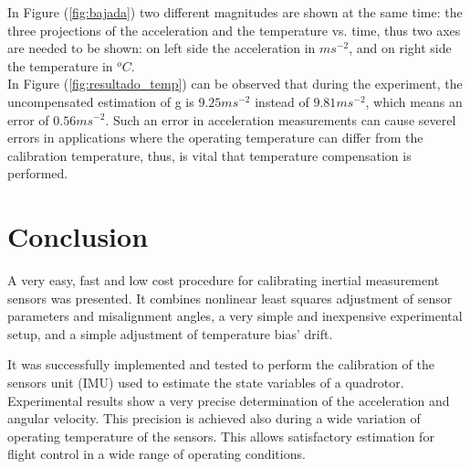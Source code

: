 \documentclass[conference]{IEEEtran}
\newcommand{\refp}[1]{(\ref{#1})}
\begin{document}
In Figure \refp{fig:bajada} two different magnitudes
are shown at the same time: the three projections of the acceleration and the
temperature vs. time, thus two axes are needed to be shown: on left side
the acceleration in $ms^{-2}$, and on right side the temperature in
$^oC$.\\

In Figure \refp{fig:resultado_temp} can be observed that during
the experiment, the uncompensated estimation of g is $9.25ms^{-2}$ instead of
$9.81ms^{-2}$, which means an error of $0.56ms^{-2}$. Such an
error in acceleration measurements can cause severel errors
in applications where the operating temperature can differ
from the calibration temperature, thus, is vital that temperature
compensation is performed.


\section{Conclusion}
A very easy, fast and low cost procedure for calibrating inertial measurement sensors was 
presented. It combines nonlinear least squares adjustment of sensor parameters and misalignment 
angles, a very simple and inexpensive experimental setup, and a simple adjustment of temperature bias' drift.

It was successfully implemented and tested to perform the calibration of the sensors unit (IMU) 
used to estimate the state variables of a quadrotor. Experimental results show a very precise determination of the acceleration and angular velocity. This precision is achieved also during a wide variation of operating temperature of the sensors. This allows satisfactory estimation for flight control in a wide range of operating conditions.




%
%
%
 



\end{document}
